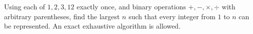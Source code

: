 Using each of $ 1,2,3,12 $ exactly once, and binary operations $+,-,\times,\div $ with arbitrary parentheses, find the largest $ n $ such that every integer from $ 1 $ to $ n $ can be represented. An exact exhaustive algorithm is allowed.
